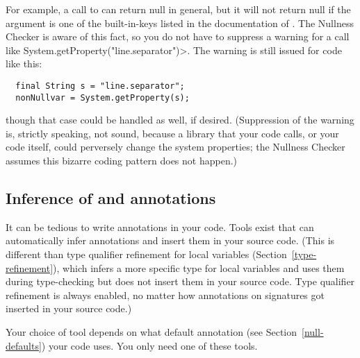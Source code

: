 For example, a call to
can return null in general, but it will not return null if the argument is
one of the built-in-keys listed in the documentation of
.
The Nullness Checker is aware of this fact, so you do not have to suppress
a warning for a call like \<System.getProperty("line.separator")>.  The
warning is still issued for code like this:

\begin{Verbatim}
  final String s = "line.separator";
  nonNullvar = System.getProperty(s);
\end{Verbatim}

\noindent
though that case could be handled as well, if desired.
(Suppression of the warning is, strictly speaking, not sound, because a
library that your code calls, or your code itself, could perversely change
the system properties; the Nullness Checker assumes this bizarre coding
pattern does not happen.)


\subsection{Inference of  and  annotations\label{nullness-inference}}

It can be tedious to write annotations in your code.  Tools exist that
can automatically infer annotations and insert them in your source code.
(This is different than type qualifier refinement for local variables
(Section~\ref{type-refinement}), which infers a more specific type for
local variables and uses them during type-checking but does not insert them
in your source code.  Type qualifier refinement is always enabled, no
matter how annotations on signatures got inserted in your source code.)

Your choice of tool depends on what default annotation (see
Section~\ref{null-defaults}) your code uses.  You only need one of these tools.

